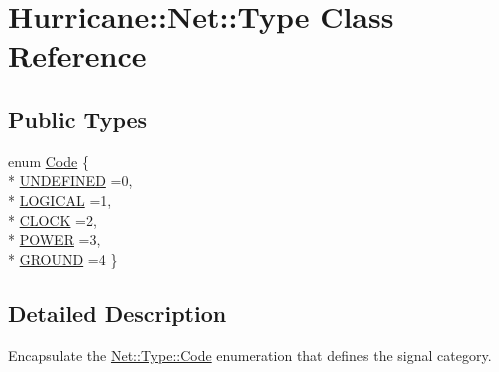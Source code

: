\hypertarget{classHurricane_1_1Net_1_1Type}{\section{Hurricane\-:\-:Net\-:\-:Type Class Reference}
\label{classHurricane_1_1Net_1_1Type}
}
\subsection*{Public Types}
\begin{DoxyCompactItemize}
\item 
enum \hyperlink{classHurricane_1_1Net_1_1Type_a2652e3299403e0f5979a848b267163a5}{Code} \{ \\*
\hyperlink{classHurricane_1_1Net_1_1Type_a2652e3299403e0f5979a848b267163a5a973ba9d650b909a277813926d7ec4f96}{U\-N\-D\-E\-F\-I\-N\-E\-D} =0, 
\\*
\hyperlink{classHurricane_1_1Net_1_1Type_a2652e3299403e0f5979a848b267163a5a8f454d4a48d8dbdd7d6341e7285b4a35}{L\-O\-G\-I\-C\-A\-L} =1, 
\\*
\hyperlink{classHurricane_1_1Net_1_1Type_a2652e3299403e0f5979a848b267163a5a94d77dd6484c8f8524a3960d42d3974b}{C\-L\-O\-C\-K} =2, 
\\*
\hyperlink{classHurricane_1_1Net_1_1Type_a2652e3299403e0f5979a848b267163a5a0b7ce81772b3f4df72edb083a52b2748}{P\-O\-W\-E\-R} =3, 
\\*
\hyperlink{classHurricane_1_1Net_1_1Type_a2652e3299403e0f5979a848b267163a5a87f5f36bbfcfac211f3dff73a8e46e65}{G\-R\-O\-U\-N\-D} =4
 \}
\end{DoxyCompactItemize}


\subsection{Detailed Description}
Encapsulate the \hyperlink{classHurricane_1_1Net_1_1Type_a2652e3299403e0f5979a848b267163a5}{Net\-::\-Type\-::\-Code} enumeration that defines the signal category. 

